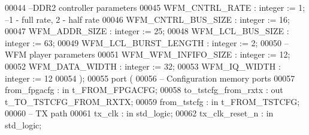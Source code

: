 \begin{DoxyCode}
00044 \textcolor{keyword}{      --DDR2 controller parameters}
00045       \textcolor{vhdlchar}{WFM_CNTRL_RATE}          \textcolor{vhdlchar}{:} \textcolor{comment}{integer} \textcolor{vhdlchar}{:=} \textcolor{vhdllogic}{}\textcolor{vhdllogic}{1};\textcolor{keyword}{ --1 - full rate, 2 - half rate}
00046       \textcolor{vhdlchar}{WFM_CNTRL_BUS_SIZE}      \textcolor{vhdlchar}{:} \textcolor{comment}{integer} \textcolor{vhdlchar}{:=} \textcolor{vhdllogic}{}\textcolor{vhdllogic}{16};
00047       \textcolor{vhdlchar}{WFM_ADDR_SIZE}           \textcolor{vhdlchar}{:} \textcolor{comment}{integer} \textcolor{vhdlchar}{:=} \textcolor{vhdllogic}{}\textcolor{vhdllogic}{25};
00048       \textcolor{vhdlchar}{WFM_LCL_BUS_SIZE}        \textcolor{vhdlchar}{:} \textcolor{comment}{integer} \textcolor{vhdlchar}{:=} \textcolor{vhdllogic}{}\textcolor{vhdllogic}{63};
00049       \textcolor{vhdlchar}{WFM_LCL_BURST_LENGTH}    \textcolor{vhdlchar}{:} \textcolor{comment}{integer} \textcolor{vhdlchar}{:=} \textcolor{vhdllogic}{}\textcolor{vhdllogic}{2};
00050 \textcolor{keyword}{      --WFM player parameters}
00051       \textcolor{vhdlchar}{WFM_WFM_INFIFO_SIZE}     \textcolor{vhdlchar}{:} \textcolor{comment}{integer} \textcolor{vhdlchar}{:=} \textcolor{vhdllogic}{}\textcolor{vhdllogic}{12};
00052       \textcolor{vhdlchar}{WFM_DATA_WIDTH}          \textcolor{vhdlchar}{:} \textcolor{comment}{integer} \textcolor{vhdlchar}{:=} \textcolor{vhdllogic}{}\textcolor{vhdllogic}{32};
00053       \textcolor{vhdlchar}{WFM_IQ_WIDTH}            \textcolor{vhdlchar}{:} \textcolor{comment}{integer} \textcolor{vhdlchar}{:=} \textcolor{vhdllogic}{}\textcolor{vhdllogic}{12}
00054    \textcolor{vhdlchar}{)};
00055    \textcolor{keywordflow}{port} \textcolor{vhdlchar}{(}
00056 \textcolor{keyword}{      -- Configuration memory ports     }
00057       \textcolor{vhdlchar}{from_fpgacfg}            \textcolor{vhdlchar}{:} \textcolor{keywordflow}{in}     \textcolor{vhdlchar}{t_FROM_FPGACFG};
00058       \textcolor{vhdlchar}{to_tstcfg_from_rxtx}     \textcolor{vhdlchar}{:} \textcolor{keywordflow}{out}    \textcolor{vhdlchar}{t_TO_TSTCFG_FROM_RXTX};
00059       \textcolor{vhdlchar}{from_tstcfg}             \textcolor{vhdlchar}{:} \textcolor{keywordflow}{in}     \textcolor{vhdlchar}{t_FROM_TSTCFG};
00060 \textcolor{keyword}{      -- TX path}
00061       \textcolor{vhdlchar}{tx_clk}                  \textcolor{vhdlchar}{:} \textcolor{keywordflow}{in}     \textcolor{comment}{std\_logic};
00062       \textcolor{vhdlchar}{tx_clk_reset_n}          \textcolor{vhdlchar}{:} \textcolor{keywordflow}{in}     \textcolor{comment}{std\_logic};    

\end{DoxyCode}
